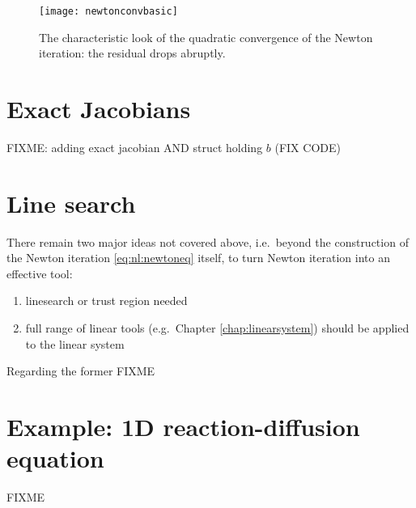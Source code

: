 \begin{figure}
\texttt{[image: newtonconvbasic]}
\caption{The characteristic look of the quadratic convergence of the Newton iteration: the residual drops abruptly.}
\label{fig:newtonconvbasic}
\end{figure}


\section{Exact Jacobians}

FIXME: adding exact jacobian AND struct holding $b$ (FIX CODE)




\section{Line search}

There remain two major ideas not covered above, i.e.~beyond the construction of the Newton iteration \eqref{eq:nl:newtoneq} itself, to turn Newton iteration into an effective tool:
\renewcommand{\labelenumi}{\roman{enumi})}
\begin{enumerate}
\item linesearch or trust region needed \citep{Kelley2003}
\item full range of linear tools (e.g.~Chapter \ref{chap:linearsystem}) should be applied to the linear system
\end{enumerate}

Regarding the former FIXME


\section{Example: 1D reaction-diffusion equation}

FIXME

\vfill
{}





